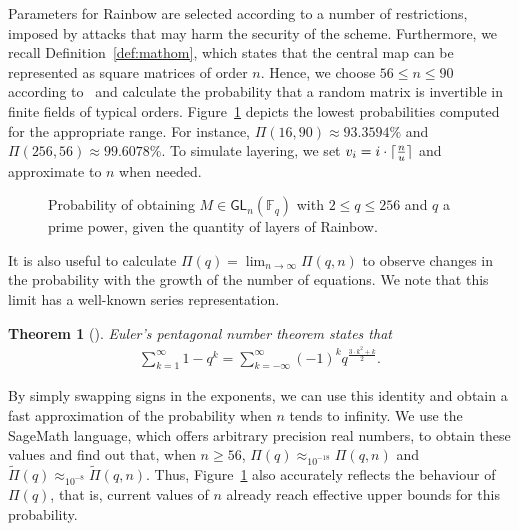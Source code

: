 \documentclass[12pt, a4paper, oneside]{memoir}
\DeclareMathOperator*{\argmin}{argmin}
\DeclarePairedDelimiter{\ceil}{\lceil}{\rceil}
\newtheorem{theorem}{Theorem}[section]
\theoremstyle{definition}
\begin{document}
Parameters for Rainbow are selected according to a number of restrictions, imposed by attacks that may harm the security of the scheme. Furthermore, we recall Definition~\ref{def:mathom}, which states that the central map can be represented as square matrices of order $n$. Hence, we choose $56 \leq n \leq 90$ according to~\cite[Tables~6.4,~6.8,~6.13]{Petzoldt:201307} and calculate the probability that a random matrix is invertible in finite fields of typical orders. Figure~\ref{fig:1} depicts the lowest probabilities computed for the appropriate range. For instance, $\Pi(16, 90) \approx 93.3594\%$ and $\Pi(256, 56) \approx 99.6078\%$. To simulate layering, we set $v_{i} = i \cdot \ceil{\frac{n}{u}}$ and approximate to $n$ when needed.

\begin{figure}[htbp]
  \subfloat[
    $\argmin_{56 \leq n \leq 90}$ of $\Pi(q, n)$
    and $\widetilde{\Pi}(q, n)$.\label{fig:1a}
  ]{
  }
  \caption{Probability of obtaining $M \in \mathsf{GL}_{n}(\mathbb{F}_{q})$
    with $2 \leq q \leq 256$ and $q$ a prime power, given the
    quantity of layers of Rainbow.}\label{fig:1}
\end{figure}

It is also useful to calculate $\Pi(q) = \lim_{n \to \infty} \Pi(q, n)$ to observe changes in the probability with the growth of the number of equations. We note that this limit has a well-known series representation.

\begin{theorem}[{\cite[Theorem 14.3]{Apostol:2010}}]
  Euler's pentagonal number theorem states that
  \begin{align}
    \sum_{k = 1}^{\infty} 1 - q^{k} = \sum_{k = -\infty}^{\infty}
    {(-1)}^{k} q^{\frac{3 \cdot k^{2} + k}{2}}.
  \end{align}
\end{theorem}

By simply swapping signs in the exponents, we can use this identity and obtain a fast approximation of the probability when $n$ tends to infinity. We use the SageMath language, which offers arbitrary precision real numbers, to obtain these values and find out that, when $n \geq 56$, $\Pi(q) \approx_{10^{-18}} \Pi(q, n)$ and $\widetilde{\Pi}(q) \approx_{10^{-8}} \widetilde{\Pi}(q, n)$. Thus, Figure~\ref{fig:1} also accurately reflects the behaviour of $\Pi(q)$, that is, current values of $n$ already reach effective upper bounds for this probability.
\end{document}
